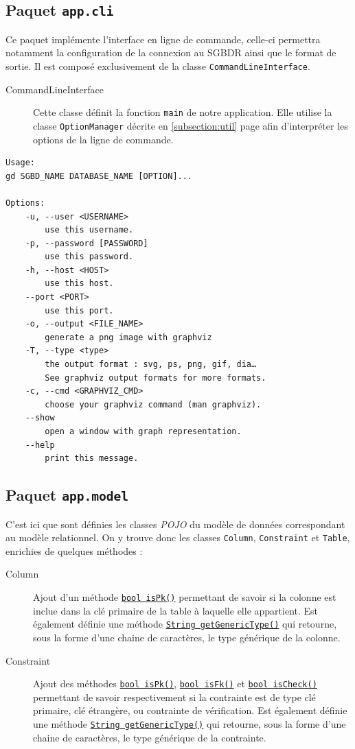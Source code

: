 \subsection{Paquet \texttt{app.cli}}

Ce paquet implémente l'interface en ligne de commande, celle-ci permettra notamment la configuration de la connexion au SGBDR ainsi que le format de sortie. Il est composé exclusivement de la classe \texttt{CommandLineInterface}.

\begin{description}
\item[CommandLineInterface] Cette classe définit la fonction \texttt{main} de notre application. Elle utilise la classe \texttt{OptionManager} décrite en \ref{subsection:util} page \pageref{subsection:util} afin d'interpréter les options de la ligne de commande.  
\end{description}

\begin{verbatim}
Usage:
gd SGBD_NAME DATABASE_NAME [OPTION]...

Options:
    -u, --user <USERNAME>
        use this username.
    -p, --password [PASSWORD]
        use this password.
    -h, --host <HOST>
        use this host.
    --port <PORT>
        use this port.
    -o, --output <FILE_NAME>
        generate a png image with graphviz
    -T, --type <type>
        the output format : svg, ps, png, gif, dia… 
        See graphviz output formats for more formats.
    -c, --cmd <GRAPHVIZ_CMD>
        choose your graphviz command (man graphviz).
    --show 
        open a window with graph representation.
    --help
        print this message.
\end{verbatim}


\subsection{Paquet \texttt{app.model}}
C'est ici que sont définies les classes \emph{POJO} du modèle de données correspondant au modèle relationnel. On y trouve donc les classes \texttt{Column}, \texttt{Constraint} et \texttt{Table}, enrichies de quelques méthodes :

\begin{description}

\item[Column] Ajout d'un méthode \texttt{\underline{bool isPk()}} permettant de savoir si la colonne est inclue dans la clé primaire de la table à laquelle elle appartient. Est également définie une méthode \texttt{\underline{String getGenericType()}} qui retourne, sous la forme d'une chaine de caractères, le type générique de la colonne.

\item[Constraint] Ajout des méthodes \texttt{\underline{bool isPk()}}, \texttt{\underline{bool isFk()}} et \texttt{\underline{bool isCheck()}} permettant de savoir respectivement si la contrainte est de type clé primaire, clé étrangère, ou contrainte de vérification. Est également définie une méthode \texttt{\underline{String getGenericType()}} qui retourne, sous la forme d'une chaine de caractères, le type générique de la contrainte.
\end{description}

